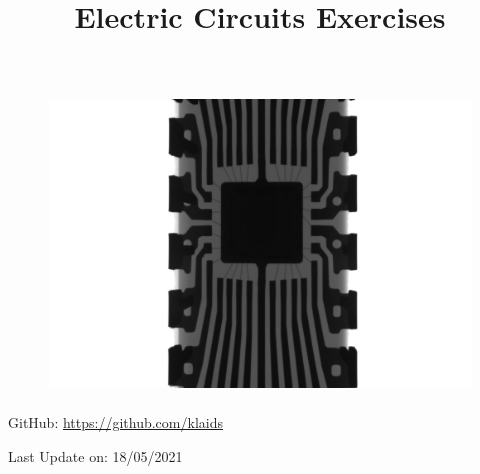 \documentclass{article}
\title{\Huge Electric Circuits Exercises}
\author{}
\date{}
\begin{document}
\maketitle
\vspace{2cm}
\begin{figure}[h]
\includegraphics[height=8cm]{img/mathew-schwartz-Il3MNqC5Q1E-unsplash.jpg}
\centering
\end{figure}
\vspace{7cm}

\large
\begin{doublespacing}
\hypersetup{
    urlcolor=black,
  }
  \centerline{GitHub: \url{https://github.com/klaids}}


\centerline{Last Update on: 18/05/2021}
\end{doublespacing}
\newpage
\tableofcontents
\clearpage
{}
\newpage

\end{document}
